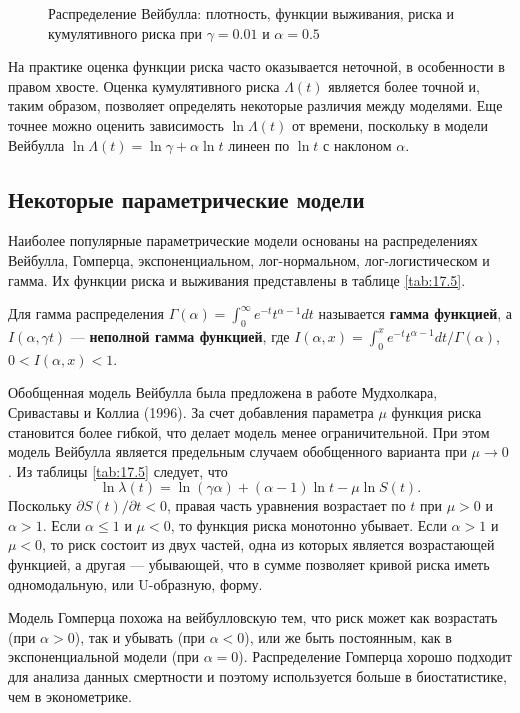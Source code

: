 \begin{figure}[ht!]\caption{Распределение Вейбулла: плотность, функции выживания, риска и кумулятивного риска при $\gamma=0.01$ и $\alpha=0.5$}\label{fig:17.2}
\centering
\end{figure}

На практике оценка функции риска часто оказывается неточной, в особенности в правом хвосте. Оценка кумулятивного риска $\Lambda(t)$ является более точной и, таким образом, позволяет определять некоторые различия между моделями. Еще точнее можно оценить зависимость $\ln\Lambda(t)$ от времени, поскольку в модели Вейбулла $\ln\Lambda(t)=\ln\gamma+\alpha\ln t$ линеен по $\ln t$ с наклоном $\alpha$.


\subsection{Некоторые параметрические модели}\label{sec:17.6.2}

\noindent
Наиболее популярные параметрические модели основаны на распределениях Вейбулла, Гомперца, экспоненциальном, лог-нормальном, лог-логистическом и гамма. Их функции риска и выживания представлены в таблице \ref{tab:17.5}.

Для гамма распределения $\Gamma(\alpha)=\int^{\infty}_{0}e^{-t}t^{\alpha-1}dt$ называется \textbf{гамма функцией}, а $I(\alpha,\gamma t)$ --- \textbf{неполной гамма функцией}, где $I(\alpha,x)=\int^{x}_{0}e^{-t}t^{\alpha-1}dt/\Gamma(\alpha)$, $0<I(\alpha,x)<1$.

Обобщенная модель Вейбулла была предложена в работе Мудхолкара, Сриваставы и Коллиа (1996). За счет добавления параметра $\mu$ функция риска становится более гибкой, что делает модель менее ограничительной. При этом модель Вейбулла является предельным случаем обобщенного варианта при $\mu\rightarrow 0$. Из таблицы \ref{tab:17.5} следует, что
    $$\ln\lambda(t)=\ln(\gamma\alpha)+(\alpha-1)\ln t-\mu\ln S(t).$$
Поскольку $\partial S(t)/\partial t<0$, правая часть уравнения возрастает по $t$ при $\mu>0$ и $\alpha>1$. Если $\alpha\le1$ и $\mu<0$, то функция риска монотонно убывает. Если $\alpha>1$ и $\mu<0$, то риск состоит из двух частей, одна из которых является возрастающей функцией, а другая --- убывающей, что в сумме позволяет кривой риска иметь одномодальную, или U-образную, форму.

Модель Гомперца похожа на вейбулловскую тем, что риск может как возрастать (при $\alpha>0$), так и убывать (при $\alpha<0$), или же быть постоянным, как в экспоненциальной модели (при $\alpha=0$). Распределение Гомперца хорошо подходит для анализа данных смертности и поэтому используется больше в биостатистике, чем в эконометрике.

